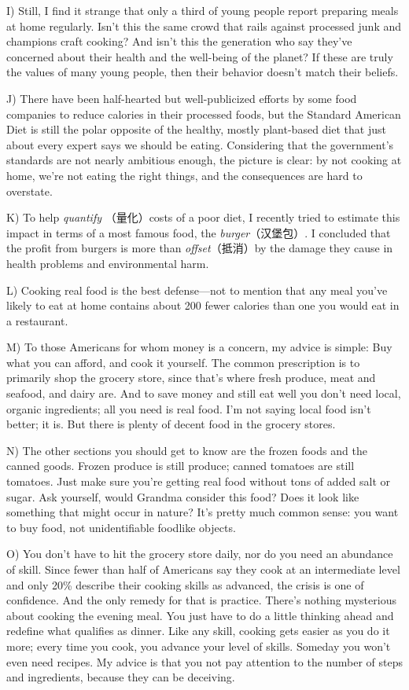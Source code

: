 \documentclass[UTF8,11pt]{ctexart}
\begin{document}
I) Still, I find it strange that only a third of young people report preparing meals at home regularly. Isn’t this the same crowd that rails against processed junk and champions craft cooking? And isn’t this the generation who say they’ve concerned about their health and the well-being of the planet? If these are truly the values of many young people, then their behavior doesn’t match their beliefs.


J) There have been half-hearted but well-publicized efforts by some food companies to reduce calories in their processed foods, but the Standard American Diet is still the polar opposite of the healthy, mostly plant-based diet that just about every expert says we should be eating. Considering that the government’s standards are not nearly ambitious enough, the picture is clear: by not cooking at home, we’re not eating the right things, and the consequences are hard to overstate.


K) To help\textit{ quantify} （量化）costs of a poor diet, I recently tried to estimate this impact in terms of a most famous food, the \textit{burger}（汉堡包）. I concluded that the profit from burgers is more than\textit{ offset}（抵消）by the damage they cause in health problems and environmental harm.


L) Cooking real food is the best defense—not to mention that any meal you’ve likely to eat at home contains about 200 fewer calories than one you would eat in a restaurant.


M) To those Americans for whom money is a concern, my advice is simple: Buy what you can afford, and cook it yourself. The common prescription is to primarily shop the grocery store, since that’s where fresh produce, meat and seafood, and dairy are. And to save money and still eat well you don’t need local, organic ingredients; all you need is real food. I’m not saying local food isn’t better; it is. But there is plenty of decent food in the grocery stores.


N) The other sections you should get to know are the frozen foods and the canned goods. Frozen produce is still produce; canned tomatoes are still tomatoes. Just make sure you’re getting real food without tons of added salt or sugar. Ask yourself, would Grandma consider this food? Does it look like something that might occur in nature? It’s pretty much common sense: you want to buy food, not unidentifiable foodlike objects.


O) You don’t have to hit the grocery store daily, nor do you need an abundance of skill. Since fewer than half of Americans say they cook at an intermediate level and only 20\% describe their cooking skills as advanced, the crisis is one of confidence. And the only remedy for that is practice. There’s nothing mysterious about cooking the evening meal. You just have to do a little thinking ahead and redefine what qualifies as dinner. Like any skill, cooking gets easier as you do it more; every time you cook, you advance your level of skills. Someday you won’t even need recipes. My advice is that you not pay attention to the number of steps and ingredients, because they can be deceiving.
\end{document}

